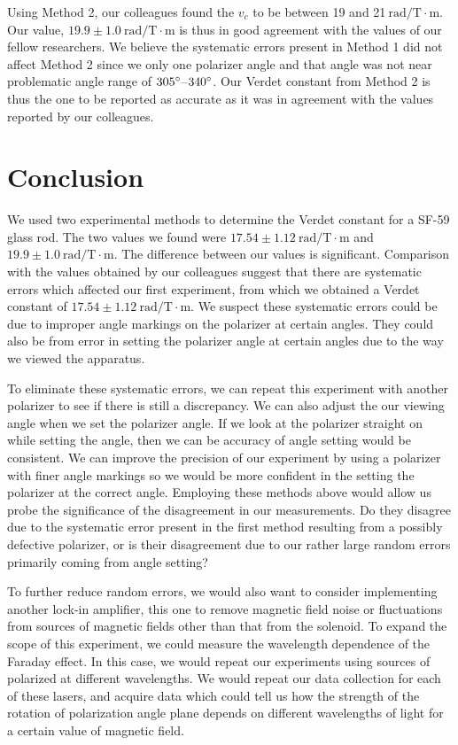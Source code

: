 \documentclass[prb,preprint]{revtex4-1}
\begin{document}
{{Using Method 2, our colleagues found the $v_c$ to be between 19 and 21$\mathrm{~rad/T} \cdot \textrm{m}$.  Our value, $19.9 \pm 1.0 \mathrm{~rad/T} \cdot \textrm{m}$ is thus in good agreement with the values of our fellow researchers.
We believe the systematic errors present in Method 1 did not affect Method 2 since we only one polarizer angle and that angle was not near problematic angle range of $305\degree$--$340\degree$.  Our Verdet constant from Method 2 is thus the one to be reported as accurate as it was in agreement with the values reported by our colleagues.}

\section{Conclusion}
We used two experimental methods to determine the Verdet constant for a SF-59 glass rod. The two values we found were $17.54 \pm 1.12 \mathrm{~rad/T} \cdot \textrm{m}$ and $19.9 \pm 1.0 \mathrm{~rad/T} \cdot \textrm{m}$. 
The difference between our values is significant. Comparison with the values obtained by our colleagues suggest that there are systematic errors which affected our first experiment, from which we obtained a Verdet constant of $17.54 \pm 1.12 \mathrm{~rad/T} \cdot \textrm{m}$. 
We suspect these systematic errors could be due to improper angle markings on the polarizer at certain angles. They could also be from error in setting the polarizer angle at certain angles due to the way we viewed the apparatus.

To eliminate these systematic errors, we can repeat this experiment with another polarizer to see if there is  still a discrepancy. 
We can also adjust the our viewing angle when we set the polarizer angle. If we look at the polarizer straight on while setting the angle, then we can be accuracy of angle setting would be consistent.
We can improve the precision of our experiment by using a polarizer with finer angle markings so we would be more confident in the setting the polarizer at the correct angle. 
Employing these methods above would allow us probe the significance of the disagreement in our measurements.  
Do they disagree due to the systematic error present in the first method resulting from a possibly defective polarizer, or is their disagreement due to our rather large random errors primarily coming from angle setting? 

To further reduce random errors, we would also want to consider implementing another lock-in amplifier, this one to remove magnetic field noise or fluctuations from sources of magnetic fields other than that from the solenoid.  To expand the scope of this experiment, we could measure the wavelength dependence of the Faraday effect.  In this case, we would repeat our experiments using sources of polarized at different wavelengths. We would repeat our data collection for each of these lasers, and acquire data which could tell us how the strength of the rotation of polarization angle plane depends on different wavelengths of light for a certain value of magnetic field.

}
\end{document}
